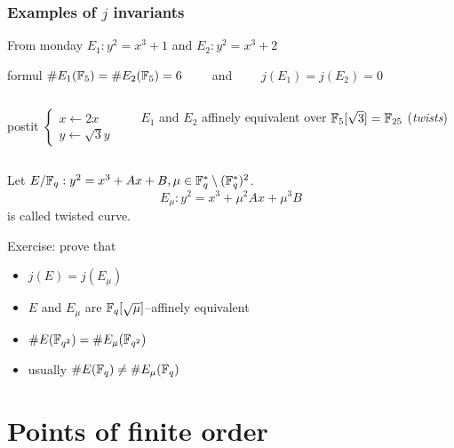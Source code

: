 \documentclass[10pt,handout]{beamer} %
\begin{document}
\begin{frame}
\frametitle{Examples of $j$ invariants}

From monday \alert{$E_1: y^2=x^3+1$} and \alert{$E_2: y^2=x^3+2$}\pause

\begin{beamercolorbox}[shadow=true,center,rounded=true,wd=9cm]{formul}
$\#E_1(\mathbb F_5)=\#E_2(\mathbb F_5)=6\qquad$ and $\qquad j(E_1)=j(E_2)=0$
\end{beamercolorbox}

\begin{columns}
\begin{column}{4cm}
\begin{beamercolorbox}[shadow=true,center,rounded=true,wd=2.5cm]{postit}
        $\begin{cases}
x\longleftarrow 2x\\
y\longleftarrow \sqrt{3}y
  \end{cases}$\end{beamercolorbox}
 \end{column}
 \begin{column}{5cm}
$E_1$ and $E_2$ affinely equivalent over $\mathbb F_5[\sqrt{3}]=\mathbb F_{25}$ (\emph{twists})
 \end{column}
 \end{columns}\pause

\begin{definition} Let $E/\mathbb F_q: y^2=x^3+Ax+B, \mu\in\mathbb F_q^*\setminus(\mathbb F_q^*)^2$.
$$E_\mu: y^2=x^3+\mu^2Ax+\mu^3B$$ is called \alert{twisted curve.}
\end{definition}\pause

\begin{beamerboxesrounded}[upper=block title example,lower=block body alerted,shadow=true]{Exercise: prove that}
\begin{itemize}[<+-| alert@+>]
  \item $j(E)=j(E_\mu)$
  \item $E$ and $E_\mu$ are $\mathbb F_q[\sqrt{\mu}]$--affinely equivalent
  \item $\#E(\mathbb F_{q^2})=\#E_\mu(\mathbb F_{q^2})$
  \item usually $\#E(\mathbb F_{q})\neq\#E_\mu(\mathbb F_{q})$
\end{itemize}
\end{beamerboxesrounded}
\end{frame}


\section{Points of finite order}
\end{document}
